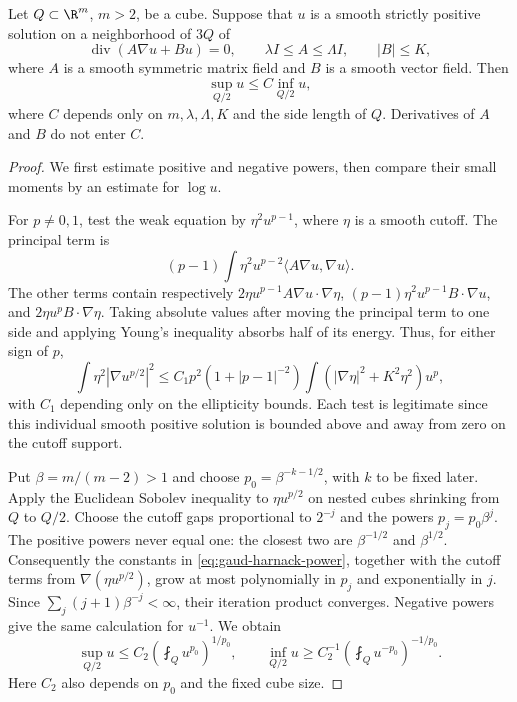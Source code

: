 \begin{lemma}\label{lem:gaud-divergence-harnack}
Let $Q\subset\R^m$, $m>2$, be a cube. Suppose that $u$ is a smooth strictly positive solution on a neighborhood of $3Q$ of
\[
 \operatorname{div}(A\nabla u+Bu)=0,
 \qquad \lambda I\leq A\leq\Lambda I,\qquad |B|\leq K,
\]
where $A$ is a smooth symmetric matrix field and $B$ is a smooth vector field. Then
\[
 \sup_{Q/2}u\leq C\inf_{Q/2}u,
\]
where $C$ depends only on $m,\lambda,\Lambda,K$ and the side length of $Q$. Derivatives of $A$ and $B$ do not enter $C$.
\end{lemma}
\begin{proof}
We first estimate positive and negative powers, then compare their small moments by an estimate for $\log u$.

For $p\ne0,1$, test the weak equation by $\eta^2u^{p-1}$, where $\eta$ is a smooth cutoff. The principal term is
\[
 (p-1)\int\eta^2u^{p-2}\langle A\nabla u,\nabla u\rangle.
\]
The other terms contain respectively $2\eta u^{p-1}A\nabla u\cdot\nabla\eta$, $(p-1)\eta^2u^{p-1}B\cdot\nabla u$, and $2\eta u^pB\cdot\nabla\eta$. Taking absolute values after moving the principal term to one side and applying Young's inequality absorbs half of its energy. Thus, for either sign of $p$,
\begin{equation}\label{eq:gaud-harnack-power}
 \int\eta^2|\nabla u^{p/2}|^2
 \leq C_1p^2(1+|p-1|^{-2})
        \int (|\nabla\eta|^2+K^2\eta^2)u^p,
\end{equation}
with $C_1$ depending only on the ellipticity bounds. Each test is legitimate since this individual smooth positive solution is bounded above and away from zero on the cutoff support.

Put $\beta=m/(m-2)>1$ and choose $p_0=\beta^{-k-1/2}$, with $k$ to be fixed later. Apply the Euclidean Sobolev inequality to $\eta u^{p/2}$ on nested cubes shrinking from $Q$ to $Q/2$. Choose the cutoff gaps proportional to $2^{-j}$ and the powers $p_j=p_0\beta^j$. The positive powers never equal one: the closest two are $\beta^{-1/2}$ and $\beta^{1/2}$. Consequently the constants in \eqref{eq:gaud-harnack-power}, together with the cutoff terms from $\nabla(\eta u^{p/2})$, grow at most polynomially in $p_j$ and exponentially in $j$. Since $\sum_j(j+1)\beta^{-j}<\infty$, their iteration product converges. Negative powers give the same calculation for $u^{-1}$. We obtain
\begin{equation}\label{eq:gaud-harnack-moments}
 \sup_{Q/2}u\leq C_2\left(\fint_Q u^{p_0}\right)^{1/p_0},
 \qquad
 \inf_{Q/2}u\geq C_2^{-1}
                  \left(\fint_Q u^{-p_0}\right)^{-1/p_0}.
\end{equation}
Here $C_2$ also depends on $p_0$ and the fixed cube size.


\end{proof}
